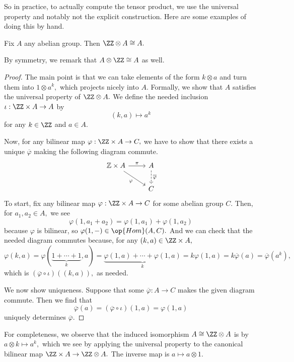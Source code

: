 So in practice, to actually compute the tensor product, we use the universal property and notably not the explicit construction. Here are some examples of doing this by hand.
\begin{proposition}
	Fix $A$ any abelian group. Then $\ZZ\otimes A\cong A.$
\end{proposition}
By symmetry, we remark that $A\otimes\ZZ\cong A$ as well.
\begin{proof}
	The main point is that we can take elements of the form $k\otimes a$ and turn them into $1\otimes a^k,$ which projects nicely into $A.$ Formally, we show that $A$ satisfies the universal property of $\ZZ\otimes A.$ We define the needed inclusion $\iota:\ZZ\times A\to A$ by
	\[(k,a)\mapsto a^k\]
	for any $k\in\ZZ$ and $a\in A.$
	
	Now, for any bilinear map $\varphi:\ZZ\times A\to C,$ we have to show that there exists a unique $\overline\varphi$ making the following diagram commute.
	\[\begin{tikzcd}
		{\mathbb Z\times A} & A \\
		& C
		\arrow["\varphi"', from=1-1, to=2-2]
		\arrow["\overline\varphi", dashed, from=1-2, to=2-2]
		\arrow["\pi", from=1-1, to=1-2]
	\end{tikzcd}\]
	To start, fix any bilinear map $\varphi:\ZZ\times A\to C$ for some abelian group $C.$ Then, for $a_1,a_2\in A,$ we see
	\[\varphi(1,a_1+a_2)=\varphi(1,a_1)+\varphi(1,a_2)\]
	because $\varphi$ is bilinear, so $\varphi(1,-)\in\op{Hom}(A,C).$ And we can check that the needed diagram commutes because, for any $(k,a)\in\ZZ\times A,$
	\[\varphi(k,a)=\varphi(\underbrace{1+\cdots+1}_k,a)=\underbrace{\varphi(1,a)+\cdots+\varphi(1,a)}_k=k\varphi(1,a)=k\overline\varphi(a)=\overline\varphi\left(a^k\right),\]
	which is $(\overline\varphi\circ\iota)((k,a)),$ as needed.

	We now show uniqueness. Suppose that some $\overline\varphi:A\to C$ makes the given diagram commute. Then we find that
	\[\overline\varphi(a)=(\overline\varphi\circ\iota)(1,a)=\varphi(1,a)\]
	uniquely determines $\overline\varphi.$
\end{proof}
For completeness, we observe that the induced isomorphism $A\cong\ZZ\otimes A$ is by $a\otimes k\mapsto a^k,$ which we see by applying the universal property to the canonical bilinear map $\ZZ\times A\to\ZZ\otimes A.$ The inverse map is $a\mapsto a\otimes1.$
